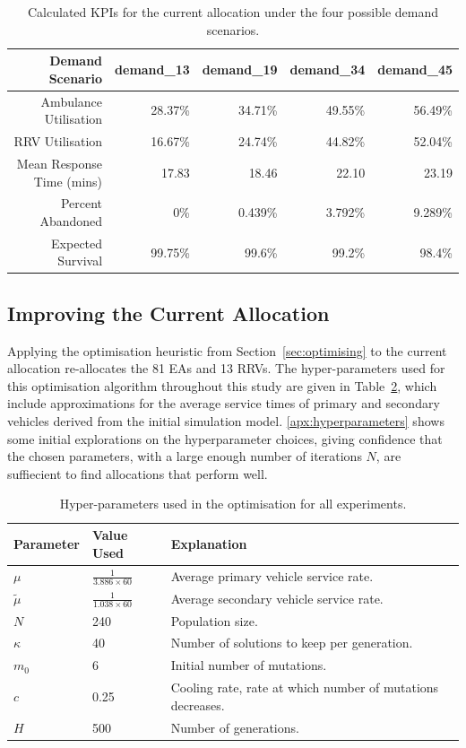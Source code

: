 \documentclass[preprint,12pt]{elsarticle}
\begin{document}
\begin{table}
\begin{center}
\small
\begin{tabular}{rrrrr}
\toprule
Demand Scenario & \textbf{demand\_13} & \textbf{demand\_19} & \textbf{demand\_34} & \textbf{demand\_45} \\
\midrule
Ambulance Utilisation & 28.37\% & 34.71\% & 49.55\% & 56.49\% \\
RRV Utilisation & 16.67\% & 24.74\% & 44.82\% & 52.04\% \\
Mean Response Time (mins) & 17.83 & 18.46 & 22.10 & 23.19 \\
Percent Abandoned & 0\% & 0.439\% & 3.792\% & 9.289\% \\
Expected Survival & 99.75\% & 99.6\% & 99.2\% & 98.4\% \\
\bottomrule
\end{tabular}
\caption{Calculated KPIs for the current allocation under the four possible
         demand scenarios.}
\label{tbl:demand_results}
\end{center}
\end{table}


\subsection{Improving the Current Allocation}\label{sec:improve_current}
Applying the optimisation heuristic from Section~\ref{sec:optimising} to the
current allocation re-allocates the 81 EAs and 13 RRVs. The hyper-parameters
used for this optimisation algorithm throughout this study are given in
Table~\ref{tbl:hyperparameters}, which include approximations for the average
service times of primary and secondary vehicles derived from the initial
simulation model. \ref{apx:hyperparameters} shows some initial explorations on
the hyperparameter choices, giving confidence that the chosen parameters, with
a large enough number of iterations $N$, are suffiecient to find allocations
that perform well.

\begin{table}
\begin{tabular}{lll}
\toprule
Parameter & Value Used & Explanation \\
\midrule
$\mu$ & $\frac{1}{3.886 \times 60}$ & Average primary vehicle service rate.\\
$\tilde{\mu}$ & $\frac{1}{1.038 \times 60}$ & Average secondary vehicle service rate.\\
$N$ & 240 & Population size.\\
$\kappa$ & 40 & Number of solutions to keep per generation.\\
$m_0$ & 6 & Initial number of mutations.\\
$c$ & 0.25 & Cooling rate, rate at which number of mutations decreases.\\
$H$ & 500 & Number of generations.\\
\bottomrule
\end{tabular}
\caption{Hyper-parameters used in the optimisation for all experiments.}
\label{tbl:hyperparameters}
\end{table}
\end{document}
